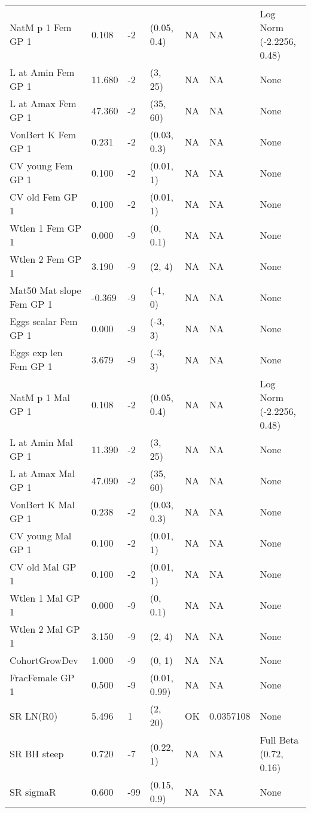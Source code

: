 \documentclass[11pt,
  english,
  a4paper,
]{article}
\begin{document}
\begin{landscape}
\begin{longtable}[t]{>{\raggedright\arraybackslash}p{6cm}lllll>{\raggedright\arraybackslash}p{4cm}}
\endfoot
\bottomrule
\endlastfoot
NatM p 1 Fem GP 1 & 0.108 & -2 & (0.05, 0.4) & NA & NA & Log Norm (-2.2256, 0.48)\\
L at Amin Fem GP 1 & 11.680 & -2 & (3, 25) & NA & NA & None\\
L at Amax Fem GP 1 & 47.360 & -2 & (35, 60) & NA & NA & None\\
VonBert K Fem GP 1 & 0.231 & -2 & (0.03, 0.3) & NA & NA & None\\
CV young Fem GP 1 & 0.100 & -2 & (0.01, 1) & NA & NA & None\\
CV old Fem GP 1 & 0.100 & -2 & (0.01, 1) & NA & NA & None\\
Wtlen 1 Fem GP 1 & 0.000 & -9 & (0, 0.1) & NA & NA & None\\
Wtlen 2 Fem GP 1 & 3.190 & -9 & (2, 4) & NA & NA & None\\
Mat50%
Mat slope Fem GP 1 & -0.369 & -9 & (-1, 0) & NA & NA & None\\
Eggs scalar Fem GP 1 & 0.000 & -9 & (-3, 3) & NA & NA & None\\
Eggs exp len Fem GP 1 & 3.679 & -9 & (-3, 3) & NA & NA & None\\
NatM p 1 Mal GP 1 & 0.108 & -2 & (0.05, 0.4) & NA & NA & Log Norm (-2.2256, 0.48)\\
L at Amin Mal GP 1 & 11.390 & -2 & (3, 25) & NA & NA & None\\
L at Amax Mal GP 1 & 47.090 & -2 & (35, 60) & NA & NA & None\\
VonBert K Mal GP 1 & 0.238 & -2 & (0.03, 0.3) & NA & NA & None\\
CV young Mal GP 1 & 0.100 & -2 & (0.01, 1) & NA & NA & None\\
CV old Mal GP 1 & 0.100 & -2 & (0.01, 1) & NA & NA & None\\
Wtlen 1 Mal GP 1 & 0.000 & -9 & (0, 0.1) & NA & NA & None\\
Wtlen 2 Mal GP 1 & 3.150 & -9 & (2, 4) & NA & NA & None\\
CohortGrowDev & 1.000 & -9 & (0, 1) & NA & NA & None\\
FracFemale GP 1 & 0.500 & -9 & (0.01, 0.99) & NA & NA & None\\
SR LN(R0) & 5.496 & 1 & (2, 20) & OK & 0.0357108 & None\\
SR BH steep & 0.720 & -7 & (0.22, 1) & NA & NA & Full Beta (0.72, 0.16)\\
SR sigmaR & 0.600 & -99 & (0.15, 0.9) & NA & NA & None\\

\end{longtable}
\end{landscape}
\end{document}
